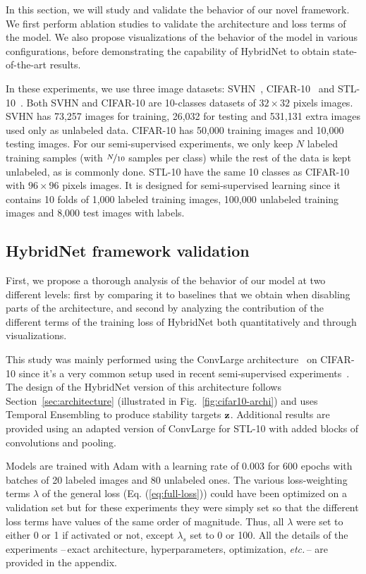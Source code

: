 \documentclass[runningheads]{llncs}
\begin{document}
In this section, we will study and validate the behavior of our novel framework. We first perform ablation studies to validate the architecture and loss terms of the model.  We also propose visualizations of the behavior of the model in various configurations, before demonstrating the capability of HybridNet to obtain state-of-the-art results.

In these experiments, we use three image datasets: SVHN~\cite{netzer2011reading}, CIFAR-10~\cite{cifar10} and STL-10~\cite{Coates2011}.
Both SVHN and CIFAR-10 are 10-classes datasets of $32\times 32$ pixels images. SVHN has 73,257 images for training, 26,032 for testing and 531,131 extra images used only as unlabeled data. CIFAR-10 has 50,000 training images and 10,000 testing images. For our semi-supervised experiments, we only keep $N$ labeled training samples (with $\nicefrac{N}{10}$ samples per class) while the rest of the data is kept unlabeled, as is commonly done.
STL-10 have the same 10 classes as CIFAR-10 with
$96\times 96$ pixels images. It is designed for semi-supervised learning since it contains 10 folds of 1,000 labeled training images, 100,000 unlabeled training images
and 8,000 test images with labels.

\subsection{HybridNet framework validation}
\label{sec:as}

First, we propose a thorough analysis of the behavior of our model at two different levels: first by comparing it to baselines that we obtain when disabling parts of the architecture, and second by analyzing the contribution of the different terms of the training loss of HybridNet both quantitatively and through visualizations.

This study was mainly performed using the ConvLarge architecture~\cite{Rasmus2015} on CIFAR-10 since it's a very common setup used in recent semi-supervised experiments~\cite{Sajjadi2016,Laine2016,Tarvainen2017}. The design of the HybridNet version of this architecture follows Section~\ref{sec:architecture} (illustrated in Fig.~\ref{fig:cifar10-archi}) and uses Temporal Ensembling to produce stability targets $\mathbf{z}$. Additional results are provided using an adapted version of ConvLarge for STL-10 with added blocks of convolutions and pooling.

Models are trained with Adam with a learning rate of 0.003 for 600 epochs with batches of 20 labeled images and 80 unlabeled ones. The various loss-weighting terms $\lambda$ of the general loss (Eq. (\ref{eq:full-loss})) could have been optimized on a validation set but for these experiments they were simply set so that the different loss terms have values of the same order of magnitude.
Thus, all $\lambda$ were set to either 0 or 1 if activated or not, except $\lambda_s$ set to 0 or 100.
All the details of the experiments --\,exact architecture, hyperparameters, optimization, \textit{etc.}\,-- are provided in the appendix.
\end{document}
